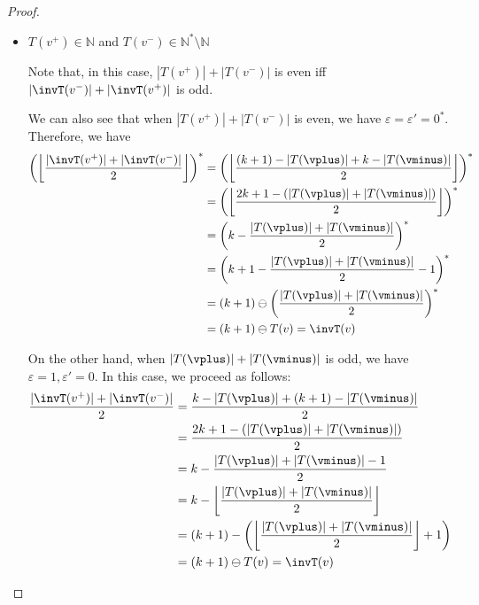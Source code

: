 \documentclass{theoretics}
\newcommand{\Nat}{\mathbb{N}}
\newcommand{\Natstro}{\mathbb{N}^* \setminus \mathbb{N}}
\newcommand{\eps}{\varepsilon}
\DeclarePairedDelimiter{\adjustfloor}{\lfloor}{\rfloor}
\newcommand{\floor}[1]{\adjustfloor*{#1}}
\newcommand{\absolut}[1]{|#1|}
\begin{document}
\begin{proof}
\begin{itemize}
		When \(\eps = \eps' = 1\) (i.e., the sum is odd and the minimum is in \(\Natstro\)), we have 
		\begin{align*}
			\floor{\frac{|\invT(v^+)|+|\invT(v^-)|}{2}} + 1 &= \floor{\frac{(k - |T(\vplus)|) + (k - |T(\vminus)|)}{2}} + 1\\
			&= \floor{k - \frac{|T(\vminus)| + |T(\vplus)|}{2}} + 1\\
			&= k - \floor{\frac{|T(\vplus)| + |T(\vminus)|}{2}} - 1 + 1\\
			&= (k+1) - \left(\floor{\frac{|T(\vplus)| + |T(\vminus)|}{2}} + 1\right)\\
			&= (k+1) \ominus T(v) = \invT(v)
		\end{align*}
		
		\smallskip
		
		\item \(T(v^+) \in \Nat\) and \(T(v^-) \in \Natstro\)
		
		Note that, in this case, \(|T(v^+)|+|T(v^-)|\) is even iff  \(|\invT(v^-)|+|\invT(v^+)|\) is odd.
		
		We can also see that when \(|T(v^+)|+|T(v^-)|\) is even, we have \(\eps = \eps' = 0^*\). 
		Therefore, we have 
		\begin{align*}
			\left(\floor{\frac{|\invT(v^+)|+|\invT(v^-)|}{2}}\right)^* &= 
			\left(\floor{\frac{(k+1) - |T(\vplus)| + k - |T(\vminus)|}{2}}\right)^* \\
			&= \left(\floor{\frac{2k+1 - (|T(\vplus)|+|T(\vminus)|)}{2}}\right)^*\\
			&= \left(k - \frac{|T(\vplus)| + |T(\vminus)|}{2}\right)^*\\
			&= \left(k+1 - \frac{|T(\vplus)| + |T(\vminus)|}{2} - 1\right)^*\\
			&= (k+1) \ominus \left(\frac{|T(\vplus)| + |T(\vminus)|}{2}\right)^*\\
			&= (k+1) \ominus T(v) = \invT(v)
		\end{align*}
		
		On the other hand, when \(|T(\vplus)| + |T(\vminus)|\) is odd, we have \(\eps = 1, \eps' = 0\). 
		In this case, we proceed as follows:
		\begin{align*}
			\frac{|\invT(v^+)|+|\invT(v^-)|}{2} &= \frac{k - |T(\vplus)| + (k+1) - |T(\vminus)|}{2}\\
			&= \frac{2k+1 - (\absolut{T(\vplus)}+\absolut{T(\vminus)})}{2}\\
			&= k - \frac{\absolut{T(\vplus)} + \absolut{T(\vminus)} -1}{2}\\
			&= k - \floor{\frac{\absolut{T(\vplus)}+ \absolut{T(\vminus)}}{2}}\\
			&= (k+1) - \left(\floor{\frac{\absolut{T(\vplus)}+ \absolut{T(\vminus)}}{2}} + 1\right)\\
			&= (k+1) \ominus T(v) = \invT(v) 
		\end{align*}
		

\end{itemize}
\end{proof}
\end{document}
